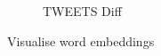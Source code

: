 \begin{figure}[!ht]
\begin{subfigure}{.16\textwidth}
  \caption{\tiny{TWEETS Diff}}
  \label{fig:tweets_diff_k16_embed_extra}
\end{subfigure}%
\vspace{1.0em}
\caption{Visualise word embeddings}
\label{fig:embeddings_all_16}
\end{figure}